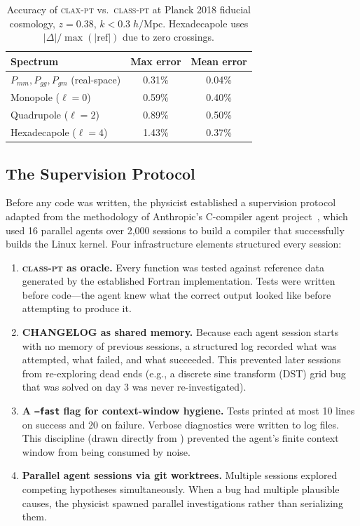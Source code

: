 \documentclass{article}
\newcommand{\claxpt}{\textsc{clax-pt}\xspace}
\newcommand{\classpt}{\textsc{class-pt}\xspace}
\begin{document}
\begin{table}[t]
\caption{Accuracy of \claxpt vs.\ \classpt at Planck 2018 fiducial cosmology, $z=0.38$, $k < 0.3\;h/$Mpc. Hexadecapole uses $|\Delta|/\max(|\mathrm{ref}|)$ due to zero crossings.}
\label{tab:accuracy}
\centering
\footnotesize
\setlength{\tabcolsep}{4pt}
\begin{tabular}{@{}lcc@{}}
\toprule
Spectrum & Max error & Mean error \\
\midrule
$P_{mm}, P_{gg}, P_{gm}$ (real-space) & 0.31\% & 0.04\% \\
Monopole ($\ell=0$) & 0.59\% & 0.40\% \\
Quadrupole ($\ell=2$) & 0.89\% & 0.50\% \\
Hexadecapole ($\ell=4$) & 1.43\% & 0.37\% \\
\bottomrule
\end{tabular}
\end{table}

\subsection{The Supervision Protocol}
\label{sec:protocol}

Before any code was written, the physicist established a supervision protocol adapted from the methodology of Anthropic's C-compiler agent project~\citep{carlini2026}, which used 16 parallel agents over 2,000 sessions to build a compiler that successfully builds the Linux kernel. Four infrastructure elements structured every session:

\begin{enumerate}
\item \textbf{\classpt as oracle.} Every function was tested against reference data generated by the established Fortran implementation. Tests were written before code---the agent knew what the correct output looked like before attempting to produce it.

\item \textbf{CHANGELOG as shared memory.} Because each agent session starts with no memory of previous sessions, a structured log recorded what was attempted, what failed, and what succeeded. This prevented later sessions from re-exploring dead ends (e.g., a discrete sine transform (DST) grid bug that was solved on day 3 was never re-investigated).

\item \textbf{A \texttt{--fast} flag for context-window hygiene.} Tests printed at most 10 lines on success and 20 on failure. Verbose diagnostics were written to log files. This discipline (drawn directly from \citet{carlini2026}) prevented the agent's finite context window from being consumed by noise.

\item \textbf{Parallel agent sessions via git worktrees.} Multiple sessions explored competing hypotheses simultaneously. When a bug had multiple plausible causes, the physicist spawned parallel investigations rather than serializing them.
\end{enumerate}
\end{document}
